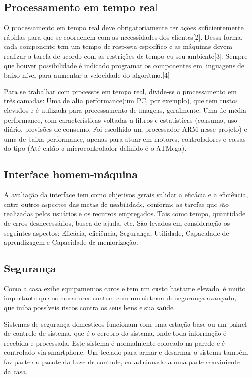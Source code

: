 \subsection{Processamento em tempo real}

	O processamento em tempo real deve obrigatoriamente ter ações suficientemente rápidas para que se coordenem com as necessidades dos clientes[2]. Dessa forma, cada componente tem um tempo de resposta específico e as máquinas devem realizar a tarefa de acordo com as restrições de tempo eu seu ambiente[3]. Sempre que houver possibilidade é indicado programar os componentes em linguagens de baixo nível para aumentar a velocidade do algorítmo.[4]

	Para se trabalhar com processos em tempo real, divide-se o processamento em três camadas: Uma de alta performance(um PC, por exemplo), que tem custos elevados e é utilizada para processamento de imagens, geralmente. Uma de média performance, com características voltadas a filtros e estatísticas (consumo, uso diário, previsões de consumo. Foi escolhido um processador ARM nesse projeto) e uma de baixa performance, apenas para atuar em motores, controladores e coisas do tipo (Até então o microcontrolador definido é o ATMega).

\subsection{Interface homem-máquina}

	A avaliação da interface tem como objetivos gerais validar a eficácia e a eficiência, entre outros aspectos das metas de usabilidade, conforme as tarefas que são realizadas pelos usuários e os recursos empregados. Tais como tempo, quantidade de erros desnecessários, busca de ajuda, etc. São levados em consideração os seguintes aspectos: Eficácia, eficiência, Segurança, Utilidade, Capacidade de aprendizagem e Capacidade de memorização.

\subsection{Segurança}

	Como a casa exibe equipamentos caros e tem um custo bastante elevado, é muito importante que os moradores contem com um sistema de segurança avançado, que iniba possíveis riscos contra os seus bens e sua saúde.

	Sistemas de segurança domesticos funcionam com uma estação base ou um painel de controle de sistema, que é o cerebro do sistema, onde toda informação é recebida e processada.  Este sistema é normalmente colocado na parede e é controlado via smartphone. Um teclado para armar e desarmar o sistema também faz parte do pacote da base de controle, ou adicionado a uma parte conviniente da casa.

